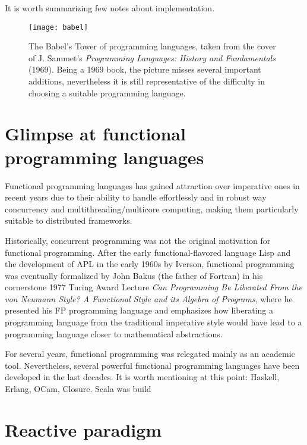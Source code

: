 


\begin{refsection}

It is worth summarizing few notes about implementation.


\begin{figure}
   \centering
   \texttt{[image: babel]}
   \caption{The Babel's Tower of programming languages, taken from the cover of
      J. Sammet's \emph{Programming Languages: History and Fundamentals} (1969).
      Being a 1969 book, the picture misses several important additions,
      nevertheless it is still representative of the difficulty in choosing a
      suitable programming language.
   }
\end{figure}

\section{Glimpse at functional programming languages}
Functional programming languages has gained attraction over imperative ones in recent years due to
their ability to handle effortlessly and in robust way concurrency and
multithreading/multicore 
computing, making them particularly suitable to distributed frameworks. 

Historically, concurrent programming was not the original motivation for
functional programming. 
After the early functional-flavored language Lisp and  the development of APL in the
early 1960s by Iverson, functional programming was eventually formalized by
John Bakus (the father of Fortran) in his
cornerstone 1977 Turing Award Lecture 
\emph{Can Programming Be Liberated From the von Neumann Style?
   A Functional Style and its Algebra of Programs}, where he presented his FP
programming language and emphasizes how liberating a programming language from
the traditional imperative style would have lead to a programming language
closer to mathematical abstractions. 

For several years, functional programming was relegated mainly as an academic
tool. Nevertheless, several powerful functional programming languages have been
developed in the last decades. It is worth mentioning at this point:
Haskell, Erlang, OCam, Closure. 
Scala was build 

\section{Reactive paradigm}


\end{refsection}
